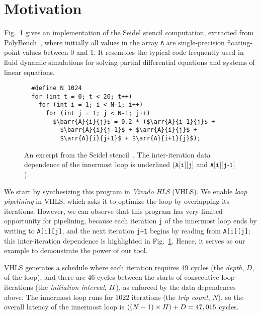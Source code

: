 \section{Motivation}
\label{sec:motivation}

\newcommand\arr[3]{\texttt{#1[#2][#3]}}
\newcommand\barr[3]{\texttt{\underline{#1[#2][#3]}}}

Fig.~\ref{fig:seidel_prog} gives an implementation of the Seidel stencil
computation, extracted from PolyBench~\cite{polybench}, where initially all
values in the array \verb|A| are single-precision floating-point values between
0 and 1.  It resembles the typical code frequently used in fluid dynamic
simulations for solving partial differential equations and systems of linear
equations.

\begin{figure}[ht]
\begin{lstlisting}
  #define N 1024
  for (int t = 0; t < 20; t++)
    for (int i = 1; i < N-1; i++)
      for (int j = 1; j < N-1; j++)
        $\barr{A}{i}{j}$ = 0.2 * ($\arr{A}{i-1}{j}$ +
          $\barr{A}{i}{j-1}$ + $\arr{A}{i}{j}$ +
          $\arr{A}{i}{j+1}$ + $\arr{A}{i+1}{j}$);
\end{lstlisting}
    \caption{%
    An excerpt from the Seidel stencil~\cite{polybench}.  The inter-iteration
    data dependence of the innermost loop is underlined ($\arr{A}{i}{j}$ and
    $\arr{A}{i}{j-1}$).}
    \label{fig:seidel_prog}
\end{figure}

We start by synthesizing this program in \emph{Vivado HLS} (VHLS)\@.  We
enable \emph{loop pipelining} in VHLS, which asks it to optimize the loop by
overlapping its iterations.  However, we can observe that this program has
very limited opportunity for pipelining, because each iteration \verb|j| of
the innermost loop ends by writing to \verb|A[i][j]|, and the next iteration
\verb|j+1| begins by reading from \verb|A[i][j]|; this inter-iteration
dependence is highlighted in Fig.~\ref{fig:seidel_prog}.  Hence, it serves as
our example to demonstrate the power of our tool.

VHLS generates a schedule where each iteration requires $49$ cycles (the
\emph{depth}, $D$, of the loop), and there are $46$ cycles between the starts
of consecutive loop iterations (the \emph{initiation interval}, $\mathit{II}$),
as enforced by the data dependences above.  The innermost loop runs for
$1022$ iterations (the \emph{trip count}, $N$), so the overall latency of the
innermost loop is $((N-1) \times \mathit{II}) + D = 47,015$ cycles.

